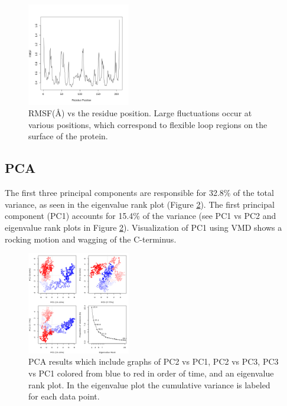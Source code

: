 \documentclass[twocolumn]{bmcart}%
\begin{document}
\begin{figure}[ht!]
  \includegraphics[width=0.4\textwidth]{htmd_analysis_rmsf}
  \caption{
      RMSF(\AA) vs the residue position. Large fluctuations occur at various positions, which correspond to flexible loop regions on the surface of the protein.}
\label{fig:rmsf}
\end{figure}

\subsection*{PCA}

The first three principal components are responsible for 32.8\% of the total variance, as seen in the eigenvalue rank plot (Figure \ref{fig:pca}). The first principal component (PC1) accounts for 15.4\% of the variance (see PC1 vs PC2 and eigenvalue rank plots in Figure \ref{fig:pca}). Visualization of PC1 using VMD shows a rocking motion and wagging of the C-terminus.


\begin{figure}[ht!]
  \includegraphics[width=0.4\textwidth]{htmd_analysis_pca}
  \caption{
      PCA results which include graphs of PC2 vs PC1, PC2 vs PC3, PC3 vs PC1  colored from blue to red in order of time, and an eigenvalue rank plot. In the eigenvalue plot the cumulative variance is labeled for each data point.}
 \label{fig:pca}
 \end{figure}
\end{document}
